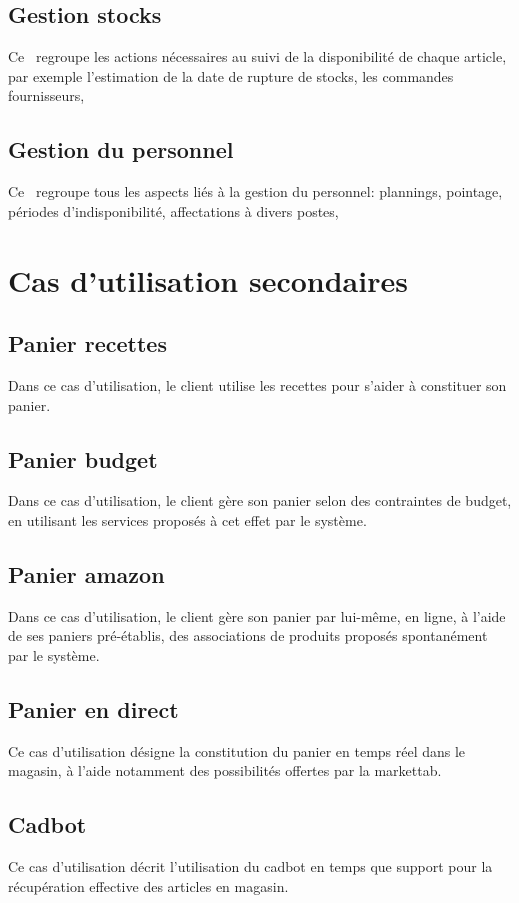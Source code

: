 \subsection{Gestion stocks}
Ce \cu\ regroupe les actions nécessaires au suivi de la disponibilité de chaque article, par exemple l'estimation de la date de rupture de stocks, les commandes fournisseurs, \etc

\subsection{Gestion du personnel}
Ce \cu\ regroupe tous les aspects liés à la gestion du personnel: plannings, pointage, périodes d'indisponibilité, affectations à divers postes, \etc

\section{Cas d'utilisation secondaires}

\subsection{Panier recettes}
Dans ce cas d'utilisation, le client utilise les recettes pour s'aider à constituer son panier.

\subsection{Panier budget}
Dans ce cas d'utilisation, le client gère son panier selon des contraintes de budget, en utilisant les services proposés à cet effet par le système.

\subsection{Panier amazon}
Dans ce cas d'utilisation, le client gère son panier par lui-même, en ligne, à l'aide de ses paniers pré-établis, des associations de produits proposés spontanément par le système.

\subsection{Panier en direct}
Ce cas d'utilisation désigne la constitution du panier en temps réel dans le magasin, à l'aide notamment des possibilités offertes par la markettab.

\subsection{Cadbot}
Ce cas d'utilisation décrit l'utilisation du cadbot en temps que support pour la récupération effective des articles en magasin.

